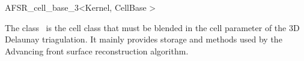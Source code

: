 \begin{ccRefClass}{AFSR_cell_base_3<Kernel, CellBase >}

\ccDefinition
  The class \ccRefName\ is the cell class that must be blended in the cell parameter
of the 3D Delaunay triagulation. It mainly provides storage and methods used by the
Advancing front surface reconstruction algorithm.



\ccInheritsFrom










\end{ccRefClass}





